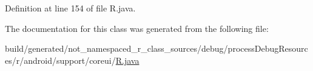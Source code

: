 Definition at line 154 of file R.\+java.



The documentation for this class was generated from the following file\+:\begin{DoxyCompactItemize}
\item 
build/generated/not\+\_\+namespaced\+\_\+r\+\_\+class\+\_\+sources/debug/process\+Debug\+Resources/r/android/support/coreui/\mbox{\hyperlink{android_2support_2coreui_2_r_8java}{R.\+java}}\end{DoxyCompactItemize}
